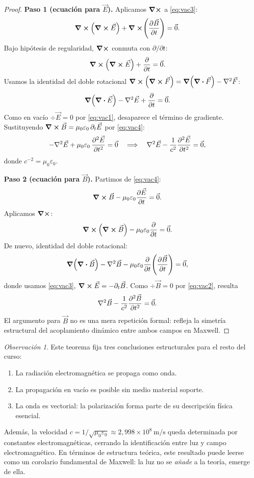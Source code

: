 \documentclass[12pt, a4paper]{article}
\theoremstyle{plain}
\theoremstyle{definition}
\theoremstyle{remark}
\newtheorem*{observacion}{Observación}
\newcommand{\ve}[1]{\vec{#1}}
\begin{document}
\begin{proof}
\textbf{Paso 1 (ecuación para $\ve{E}$).} Aplicamos $\curl$ a
\eqref{eq:vac3}:
\[
  \curl(\curl\ve{E})+\curl\!\left(\pdv{\ve{B}}{t}\right)=\ve{0}.
\]
Bajo hipótesis de regularidad, $\curl$ conmuta con $\partial/\partial t$:
\[
  \curl(\curl\ve{E})+\pdv{}{t}(\curl\ve{B})=\ve{0}.
\]
Usamos la identidad del doble rotacional
$\curl(\curl\ve{F})=\grad(\div\ve{F})-\nabla^2\ve{F}$:
\[
  \grad(\div\ve{E})-\nabla^2\ve{E}+\pdv{}{t}(\curl\ve{B})=\ve{0}.
\]
Como en vacío $\div\ve{E}=0$ por \eqref{eq:vac1}, desaparece el término de
gradiente. Sustituyendo $\curl\ve{B}=\mu_0\varepsilon_0\,\partial_t\ve{E}$ por
\eqref{eq:vac4}:
\[
  -\nabla^2\ve{E}+\mu_0\varepsilon_0\,\pdv[2]{\ve{E}}{t}= \ve{0}
  \quad\Longrightarrow\quad
  \nabla^2\ve{E}-\frac{1}{c^2}\pdv[2]{\ve{E}}{t}= \ve{0},
\]
donde $c^{-2}=\mu_0\varepsilon_0$.

\textbf{Paso 2 (ecuación para $\ve{B}$).} Partimos de \eqref{eq:vac4}:
\[
  \curl\ve{B}-\mu_0\varepsilon_0\pdv{\ve{E}}{t}=\ve{0}.
\]
Aplicamos $\curl$:
\[
  \curl(\curl\ve{B})-\mu_0\varepsilon_0\pdv{}{t}(\curl\ve{E})=\ve{0}.
\]
De nuevo, identidad del doble rotacional:
\[
  \grad(\div\ve{B})-\nabla^2\ve{B}
  -\mu_0\varepsilon_0\pdv{}{t}\!\left(\pdv{\ve{B}}{t}\right)=\ve{0},
\]
donde usamos \eqref{eq:vac3}, $\curl\ve{E}=-\partial_t\ve{B}$. Como
$\div\ve{B}=0$ por \eqref{eq:vac2}, resulta
\[
  \nabla^2\ve{B}-\frac{1}{c^2}\pdv[2]{\ve{B}}{t}= \ve{0}.
\]
El argumento para $\ve{B}$ no es una mera repetición formal: refleja la
simetría estructural del acoplamiento dinámico entre ambos campos en Maxwell.
\end{proof}

\begin{observacion}
Este teorema fija tres conclusiones estructurales para el resto del curso:
\begin{enumerate}
  \item La radiación electromagnética se propaga como onda.
  \item La propagación en vacío es posible sin medio material soporte.
  \item La onda es vectorial: la polarización forma parte de su descripción
        física esencial.
\end{enumerate}
Además, la velocidad
$c=1/\sqrt{\mu_0\varepsilon_0}\approx2{,}998\times10^8\ \mathrm{m/s}$ queda
determinada por constantes electromagnéticas, cerrando la identificación entre
luz y campo electromagnético. En términos de estructura teórica, este resultado
puede leerse como un corolario fundamental de Maxwell: la luz no se \emph{añade}
a la teoría, emerge de ella.
\end{observacion}
\end{document}
